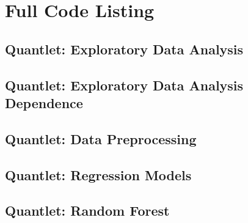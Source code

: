 
\section{Full Code Listing}
\subsection{Quantlet: Exploratory Data Analysis}

\subsection{Quantlet: Exploratory Data Analysis Dependence}

\subsection{Quantlet: Data Preprocessing}

\subsection{Quantlet: Regression Models}

\subsection{Quantlet: Random Forest}

